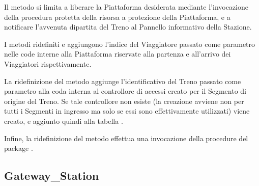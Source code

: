 	Il metodo  si limita a liberare la Piattaforma desiderata mediante l'invocazione della procedura protetta  della risorsa a protezione della Piattaforma, e a notificare l'avvenuta dipartita del Treno al Pannello informativo della Stazione.
	
	I metodi ridefiniti  e  aggiungono l'indice del Viaggiatore passato come parametro nelle code interne alla Piattaforma riservate alla partenza e all'arrivo dei Viaggiatori rispettivamente. 
	
	La ridefinizione del metodo  aggiunge l'identificativo del Treno passato come parametro alla coda interna al controllore di accessi creato per il Segmento di origine del Treno. Se tale controllore non esiste (la creazione avviene non per tutti i Segmenti in ingresso ma solo se essi sono effettivamente utilizzati) viene creato, e aggiunto quindi alla tabella .
	
	Infine, la ridefinizione del metodo  effettua una invocazione della procedure  del package .
	
	\subsection{Gateway\_Station}
	

